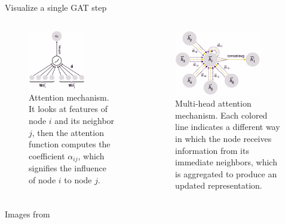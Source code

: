 \documentclass[10pt, aspectratio=169, compress, protectframetitle, handout]{beamer}
\begin{document}
\begin{frame}{Visualize a single GAT step}

    \begin{columns}[onlytextwidth]
        \begin{column}{.5\textwidth}
            \begin{figure}
                \centering
                \includegraphics[width=0.65\textwidth]{figures/GAT_step_1.png}
                \caption{Attention mechanism. It looks at features of node $i$ and its neighbor $j$, then the attention function computes the coefficient $\alpha_{ij}$, which signifies the influence of node $i$ to node $j$.}
                \label{fig:GAT_step_1}
            \end{figure}
        \end{column}
        
        \begin{column}{.5\textwidth}
            \begin{figure}
                \centering
                \includegraphics[width=0.8\textwidth]{figures/GAT_step_2.png}
                \caption{Multi-head attention mechanism. Each colored line indicates a different way in which the node receives information from its immediate neighbors, which is aggregated to produce an updated representation.}
                \label{fig:GAT_step_2}
            \end{figure}
        \end{column}
    \end{columns}
    \footnotesize{Images from \cite{PetarIntroGNN}}
\end{frame}
\end{document}
